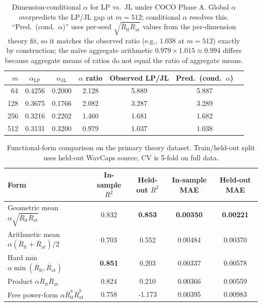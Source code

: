 \documentclass{article}
\newcommand{\avgR}{\overline{R}}
\begin{document}
\begin{table}[ht]
  \caption{Dimension-conditional $\alpha$ for LP vs.\ JL under COCO Phase A.
  Global $\alpha$ overpredicts the LP/JL gap at $m=512$; conditional $\alpha$ resolves this.
  ``Pred.\ (cond.\ $\alpha$)'' uses per-seed $\sqrt{\avgR_\mathrm{it}\avgR_\mathrm{at}}$ values from the per-dimension theory fit, so it matches the observed ratio (e.g., $1.038$ at $m=512$) exactly by construction; the na\"{i}ve aggregate arithmetic $0.979\times 1.015\approx 0.994$ differs because aggregate means of ratios do not equal the ratio of aggregate means.}
  \label{tab:alpha_conditional}
  \centering
  \footnotesize
  \begin{tabular}{rcccccc}
    \toprule
    $m$ & $\alpha_\mathrm{LP}$ & $\alpha_\mathrm{JL}$ & $\alpha$ ratio & Observed LP/JL & Pred.\ (cond.\ $\alpha$) \\
    \midrule
    64  & 0.4256 & 0.2000 & 2.128 & 5.889 & 5.887 \\
    128 & 0.3675 & 0.1766 & 2.082 & 3.287 & 3.289 \\
    256 & 0.3216 & 0.2202 & 1.460 & 1.681 & 1.682 \\
    512 & 0.3131 & 0.3200 & 0.979 & 1.037 & 1.038 \\
    \bottomrule
  \end{tabular}
\end{table}

\begin{table}[ht]
  \caption{Functional-form comparison on the primary theory dataset.
  Train/held-out split uses held-out WavCaps source; CV is 5-fold on full data.}
  \label{tab:form_compare}
  \centering
  \footnotesize
  \begin{tabular}{lcccc}
    \toprule
    Form & In-sample $R^2$ & Held-out $R^2$ & In-sample MAE & Held-out MAE \\
    \midrule
    Geometric mean $\alpha\sqrt{\avgR_\mathrm{it}\avgR_\mathrm{at}}$ & 0.832 & \textbf{0.853} & \textbf{0.00350} & \textbf{0.00221} \\
    Arithmetic mean $\alpha(\avgR_\mathrm{it}+\avgR_\mathrm{at})/2$ & 0.703 & 0.552 & 0.00484 & 0.00370 \\
    Hard min $\alpha\min(\avgR_\mathrm{it},\avgR_\mathrm{at})$ & \textbf{0.851} & 0.203 & 0.00337 & 0.00578 \\
    Product $\alpha\avgR_\mathrm{it}\avgR_\mathrm{at}$ & 0.824 & 0.210 & 0.00366 & 0.00559 \\
    Free power-form $\alpha\avgR_\mathrm{it}^a\avgR_\mathrm{at}^b$ & 0.758 & -1.173 & 0.00395 & 0.00983 \\
    \bottomrule
  \end{tabular}
\end{table}
\end{document}
